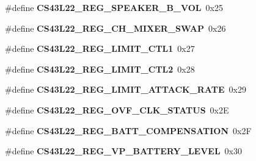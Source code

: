 \begin{DoxyCompactItemize}
\mbox{\label{group___c_s43_l22___exported___constants_ga693427f312ad8118c2009f9639e10d63}} 
\#define {\bfseries C\+S43\+L22\+\_\+\+R\+E\+G\+\_\+\+S\+P\+E\+A\+K\+E\+R\+\_\+\+B\+\_\+\+V\+OL}~0x25
\item 
\mbox{\label{group___c_s43_l22___exported___constants_ga4afa4000420c70ccf497af18fe950a3e}} 
\#define {\bfseries C\+S43\+L22\+\_\+\+R\+E\+G\+\_\+\+C\+H\+\_\+\+M\+I\+X\+E\+R\+\_\+\+S\+W\+AP}~0x26
\item 
\mbox{\label{group___c_s43_l22___exported___constants_gaa3a52d5d035710e3a93885d1b320a682}} 
\#define {\bfseries C\+S43\+L22\+\_\+\+R\+E\+G\+\_\+\+L\+I\+M\+I\+T\+\_\+\+C\+T\+L1}~0x27
\item 
\mbox{\label{group___c_s43_l22___exported___constants_gaf53f2ad75757474c9f6fc6dfc3ad4ba0}} 
\#define {\bfseries C\+S43\+L22\+\_\+\+R\+E\+G\+\_\+\+L\+I\+M\+I\+T\+\_\+\+C\+T\+L2}~0x28
\item 
\mbox{\label{group___c_s43_l22___exported___constants_ga73ea75bd5baaedaa6150987cadac10c9}} 
\#define {\bfseries C\+S43\+L22\+\_\+\+R\+E\+G\+\_\+\+L\+I\+M\+I\+T\+\_\+\+A\+T\+T\+A\+C\+K\+\_\+\+R\+A\+TE}~0x29
\item 
\mbox{\label{group___c_s43_l22___exported___constants_ga6c2fdf1e18589596c411dd54965749c2}} 
\#define {\bfseries C\+S43\+L22\+\_\+\+R\+E\+G\+\_\+\+O\+V\+F\+\_\+\+C\+L\+K\+\_\+\+S\+T\+A\+T\+US}~0x2E
\item 
\mbox{\label{group___c_s43_l22___exported___constants_gaefc94496fe5da1d9e599859f64a0b80c}} 
\#define {\bfseries C\+S43\+L22\+\_\+\+R\+E\+G\+\_\+\+B\+A\+T\+T\+\_\+\+C\+O\+M\+P\+E\+N\+S\+A\+T\+I\+ON}~0x2F
\item 
\mbox{\label{group___c_s43_l22___exported___constants_ga362e44aaf82abc6eeac36038da58d716}} 
\#define {\bfseries C\+S43\+L22\+\_\+\+R\+E\+G\+\_\+\+V\+P\+\_\+\+B\+A\+T\+T\+E\+R\+Y\+\_\+\+L\+E\+V\+EL}~0x30

\end{DoxyCompactItemize}
